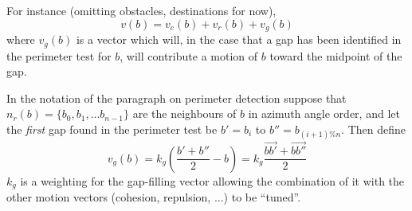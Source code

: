 \documentclass[12pt,a4paper]{article}
\begin{document}
For instance (omitting obstacles, destinations for now),
\begin{equation}\label{eq:newModel3}
v(b) = v_c(b) + v_r(b) + v_g(b)
\end{equation}
where $v_g(b)$ is a vector which will, in the case that a gap has been identified in the perimeter test for $b$, will contribute a motion of $b$ toward the midpoint of the gap.

In the notation of the paragraph on perimeter detection suppose that $n_r(b) = \{b_0, b_1, ... b_{n-1}\}$ are the neighbours of $b$ in azimuth angle order, and let the \emph{first} gap found in the perimeter test be $b' = b_i$ to $b'' = b_{(i+1)\%n}$. Then define
\begin{equation}\label{eq:gap}
v_g(b) = k_g \left (\frac{b' + b''}{2} - b \right) = k_g \frac{\vec{bb'} + \vec{bb''}}{2} 
\end{equation}
$k_g$ is a weighting for the gap-filling vector allowing the combination of it with the other motion vectors (cohesion, repulsion, ...) to be ``tuned''.
\end{document}
